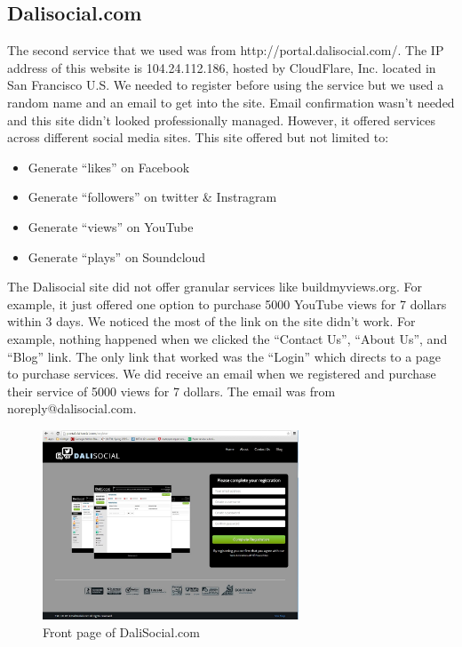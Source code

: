 \documentclass[conference]{IEEEtran}
\begin{document}
\subsection{Dalisocial.com}

The second service that we used was from http://portal.dalisocial.com/. The IP address of this website is 104.24.112.186, hosted by CloudFlare, Inc. located in San Francisco U.S. We needed to register before using the service but we used a random name and an email to get into the site. Email confirmation wasn't needed and this site didn't looked professionally managed. However, it offered services across different social media sites. This site offered but not limited to:

\begin{itemize}
  \item Generate ``likes'' on Facebook
  \item Generate ``followers'' on twitter \& Instragram
  \item Generate ``views'' on YouTube
  \item Generate ``plays'' on Soundcloud
\end{itemize}

The Dalisocial site did not offer granular services like buildmyviews.org. For example, it just offered one option to purchase 5000 YouTube views for 7 dollars within 3 days. We noticed the most of the link on the site didn't work. For example, nothing happened when we clicked the ``Contact Us'', ``About Us'', and ``Blog'' link. The only link that worked was the ``Login'' which directs to a page to purchase services. We did receive an email when we registered and purchase their service of 5000 views for 7 dollars. The email was from noreply@dalisocial.com.

\begin{figure}
  \centering
  \includegraphics[width=3.0in]{fig2}
  \caption{Front page of DaliSocial.com}
\end{figure}
\end{document}
